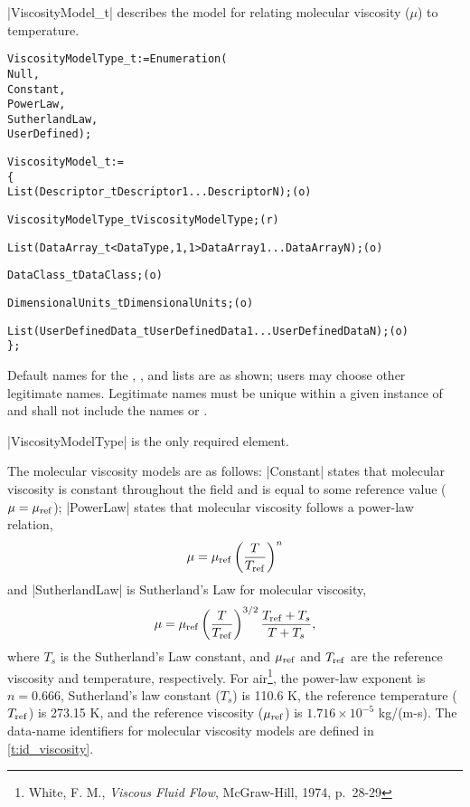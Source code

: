 |ViscosityModel_t| describes the model for relating molecular
viscosity ($\mu$) to temperature.
\begin{alltt}
  ViscosityModelType\_t := Enumeration(
    Null,
    Constant,
    PowerLaw,
    SutherlandLaw,
    UserDefined ) ;

  ViscosityModel\_t :=
    \{
    List( Descriptor\_t Descriptor1 ... DescriptorN ) ;                      (o)

    ViscosityModelType\_t ViscosityModelType ;                               (r)
    
    List( DataArray\_t<DataType, 1, 1> DataArray1 ... DataArrayN ) ;         (o)

    DataClass\_t DataClass ;                                                 (o)
                
    DimensionalUnits\_t DimensionalUnits ;                                   (o)

    List( UserDefinedData\_t UserDefinedData1 ... UserDefinedDataN ) ;       (o)
    \} ;
\end{alltt}

\begin{notes}
\item
 Default names for the , , and
 lists are as shown; users may choose other legitimate names.
 Legitimate names must be unique within a given instance of
  and shall not include the names
  or .
\item
 |ViscosityModelType| is the only required element.
\end{notes}

The molecular viscosity models are as follows: |Constant| states that
molecular viscosity is constant throughout the field and is equal to some
reference value ($\mu = \mu_{\rm ref}$); |PowerLaw| states that molecular
viscosity follows a power-law relation,
$$
 \mu = \mu_{\rm ref} \left( T \over T_{\rm ref} \right)^n
$$
and |SutherlandLaw| is Sutherland's Law for molecular viscosity,
$$
 \mu = \mu_{\rm ref} \left( T \over T_{\rm ref} \right)^{3/2} 
  {T_{\rm ref} + T_s \over T + T_s},
$$
where $T_s$ is the Sutherland's Law constant, and $\mu_{\rm ref}$ and
$T_{\rm ref}$ are the reference viscosity and temperature, respectively.
For air\footnote{White, F. M., {\it Viscous Fluid Flow}, McGraw-Hill, 1974,
p.~28-29}, the power-law exponent is $n = 0.666$, Sutherland's law constant
($T_s$) is 110.6 K, the reference temperature ($T_{\rm ref}$) is 273.15 K,
and the reference viscosity ($\mu_{\rm ref}$) is 
$1.716 \!\times\! 10^{-5}$ kg/(m-s).
The data-name identifiers for molecular viscosity models are defined in
\autoref{t:id_viscosity}.

